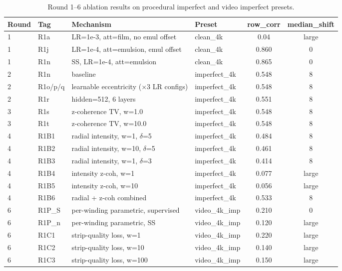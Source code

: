 \documentclass[11pt,a4paper]{article}
\begin{document}
\begin{table}[H]
\centering
\small
\begin{tabular}{llllcc}
\toprule
Round & Tag & Mechanism & Preset & row\_corr & median\_shift \\
\midrule
1 & R1a & LR=1e-3, att=film, no emul offset & clean\_4k & 0.04 & large \\
1 & R1j & LR=1e-4, att=emulsion, emul offset & clean\_4k & 0.860 & 0 \\
1 & R1n & SS, LR=1e-4, att=emulsion & clean\_4k & 0.865 & 0 \\
\midrule
2 & R1n & baseline & imperfect\_4k & 0.548 & 8 \\
2 & R1o/p/q & learnable eccentricity ($\times$3 LR configs) & imperfect\_4k & 0.548 & 8 \\
2 & R1r & hidden=512, 6 layers & imperfect\_4k & 0.551 & 8 \\
\midrule
3 & R1s & z-coherence TV, w=1.0 & imperfect\_4k & 0.548 & 8 \\
3 & R1t & z-coherence TV, w=10.0 & imperfect\_4k & 0.548 & 8 \\
\midrule
4 & R1B1 & radial intensity, w=1, $\delta$=5 & imperfect\_4k & 0.484 & 8 \\
4 & R1B2 & radial intensity, w=10, $\delta$=5 & imperfect\_4k & 0.461 & 8 \\
4 & R1B3 & radial intensity, w=1, $\delta$=3 & imperfect\_4k & 0.414 & 8 \\
4 & R1B4 & intensity z-coh, w=1 & imperfect\_4k & 0.077 & large \\
4 & R1B5 & intensity z-coh, w=10 & imperfect\_4k & 0.056 & large \\
4 & R1B6 & radial + z-coh combined & imperfect\_4k & 0.533 & 8 \\
\midrule
6 & R1P\_S & per-winding parametric, supervised & video\_4k\_imp & 0.210 & 0 \\
6 & R1P\_n & per-winding parametric, SS & video\_4k\_imp & 0.120 & large \\
6 & R1C1 & strip-quality loss, w=1 & video\_4k\_imp & 0.220 & large \\
6 & R1C2 & strip-quality loss, w=10 & video\_4k\_imp & 0.140 & large \\
6 & R1C3 & strip-quality loss, w=100 & video\_4k\_imp & 0.150 & large \\
\bottomrule
\end{tabular}
\caption{Round 1--6 ablation results on procedural imperfect and video imperfect presets.}
\end{table}
\end{document}

